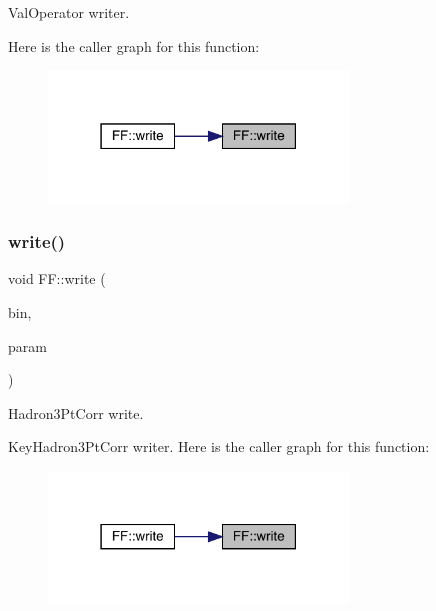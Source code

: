 Val\+Operator writer. 

Here is the caller graph for this function\+:\nopagebreak
\begin{figure}[H]
\begin{center}
\leavevmode
\includegraphics[width=226pt]{d5/da6/namespaceFF_a6906b2ce111930a390f4a8e81b1730b6_icgraph}
\end{center}
\end{figure}
\mbox{\label{namespaceFF_a7d3abdd11ac7f8c96ec4cfab1360b20a}} 
\subsubsection{\texorpdfstring{write()}{write()}\hspace{0.1cm}{\footnotesize\ttfamily [13/13]}}
{\footnotesize\ttfamily void F\+F\+::write (\begin{DoxyParamCaption}\item[{\mbox{\hyperlink{classADATIO_1_1BinaryWriter}{Binary\+Writer}} \&}]{bin,  }\item[{const \mbox{\hyperlink{structFF_1_1KeyHadron3PtCorr__t}{Key\+Hadron3\+Pt\+Corr\+\_\+t}} \&}]{param }\end{DoxyParamCaption})}



Hadron3\+Pt\+Corr write. 

Key\+Hadron3\+Pt\+Corr writer. Here is the caller graph for this function\+:\nopagebreak
\begin{figure}[H]
\begin{center}
\leavevmode
\includegraphics[width=226pt]{d5/da6/namespaceFF_a7d3abdd11ac7f8c96ec4cfab1360b20a_icgraph}
\end{center}
\end{figure}
